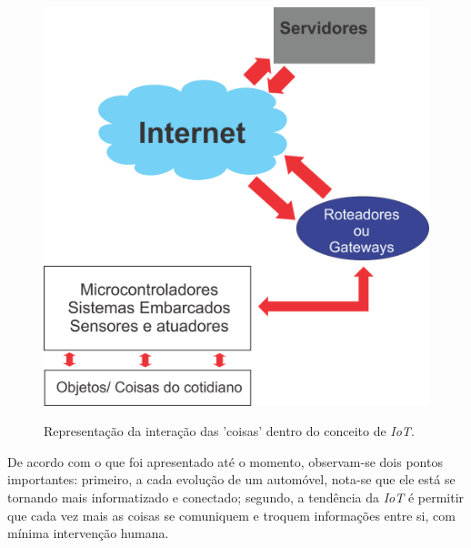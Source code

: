 \begin{figure}[!ht]
\centering
\caption{Representação da interação das 'coisas' dentro do conceito de \textit{IoT}.} 
{\includegraphics[scale=.40]{imagens/diagramaIOT.png}}\\
 \label{Fig:representacao_iot}
\end{figure}

De acordo com o que foi apresentado até o momento, observam-se dois pontos importantes: primeiro, a cada evolução de um automóvel, nota-se que ele está se tornando mais informatizado e conectado; segundo, a tendência da \textit{IoT} é permitir que cada vez mais as coisas se comuniquem e troquem informações entre si, com mínima intervenção humana.
